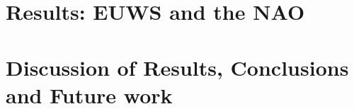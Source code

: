 \documentclass[12pt, a4paper, onecolumn]{report}
\begin{document}
\chapter{Results: EUWS and the NAO}
    

\chapter{Discussion of Results, Conclusions and Future work}
    



\renewcommand{\refname}{References}
    
    

\appendix
    
\end{document}
